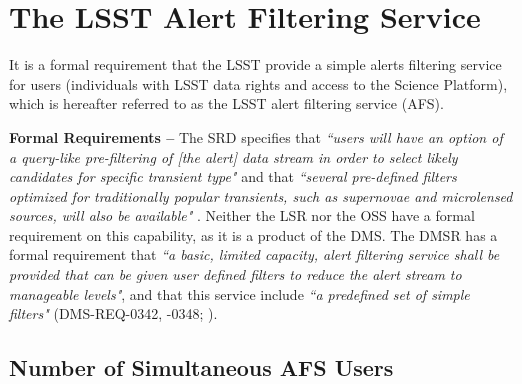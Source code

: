 \documentclass[DM,authoryear,toc]{lsstdoc}
\begin{document}
% 
% 



\section{The LSST Alert Filtering Service} \label{sec:LAFS}

It is a formal requirement that the LSST provide a simple alerts filtering service for users (individuals with LSST data rights and access to the Science Platform), which is hereafter referred to as the LSST alert filtering service (AFS).

{\bf Formal Requirements --} The SRD specifies that {\it ``users will have an option of a query-like pre-filtering of [the alert] data stream in order to select likely candidates for specific transient type"} and that {\it ``several pre-defined filters optimized for traditionally popular transients, such as supernovae and microlensed sources, will also be available"} . Neither the LSR nor the OSS have a formal requirement on this capability, as it is a product of the DMS. The DMSR has a formal requirement that {\it ``a basic, limited capacity, alert filtering service shall be provided that can be given user defined filters to reduce the alert stream to manageable levels"}, and that this service include {\it ``a predefined set of simple filters"} (DMS-REQ-0342, -0348; ). 


\subsection{Number of Simultaneous AFS Users}\label{ssec:AFS_users}
\end{document}
